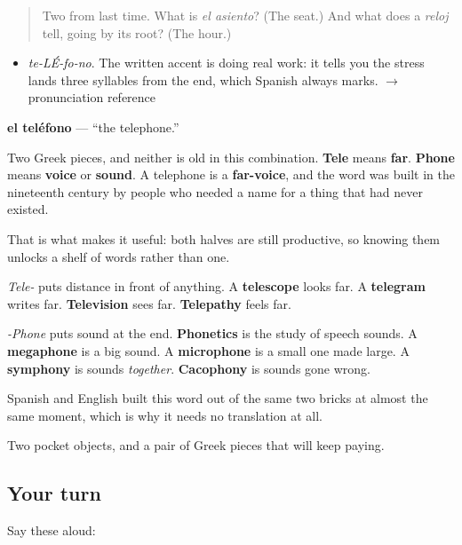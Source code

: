 \label{lesson:ES-C312-telefono}



\begin{quote}
Two from last time. What is \emph{el asiento}? (The seat.) And what does a \emph{reloj} tell, going by its root? (The hour.)
\end{quote}

\begin{sounds}
\begin{itemize}
\raggedright
  \item \emph{te-LÉ-fo-no}. The written accent is doing real work: it tells you the stress lands three syllables from the end, which Spanish always marks. $\to$ pronunciation reference
\end{itemize}
\end{sounds}

\begin{cousinweb}
\textbf{el teléfono} — \textquotedblleft{}the telephone.\textquotedblright{}

Two Greek pieces, and neither is old in this combination. \textbf{Tele} means \textbf{far}. \textbf{Phone} means \textbf{voice} or \textbf{sound}. A telephone is a \textbf{far-voice}, and the word was built in the nineteenth century by people who needed a name for a thing that had never existed.

That is what makes it useful: both halves are still productive, so knowing them unlocks a shelf of words rather than one.

\emph{Tele-} puts distance in front of anything. A \textbf{telescope} looks far. A \textbf{telegram} writes far. \textbf{Television} sees far. \textbf{Telepathy} feels far.

\emph{-Phone} puts sound at the end. \textbf{Phonetics} is the study of speech sounds. A \textbf{megaphone} is a big sound. A \textbf{microphone} is a small one made large. A \textbf{symphony} is sounds \emph{together}. \textbf{Cacophony} is sounds gone wrong.

Spanish and English built this word out of the same two bricks at almost the same moment, which is why it needs no translation at all.
\end{cousinweb}

\begin{grammarlens}[title={What you've built}]
Two pocket objects, and a pair of Greek pieces that will keep paying.
\end{grammarlens}

\subsection*{Your turn}
Say these aloud:

